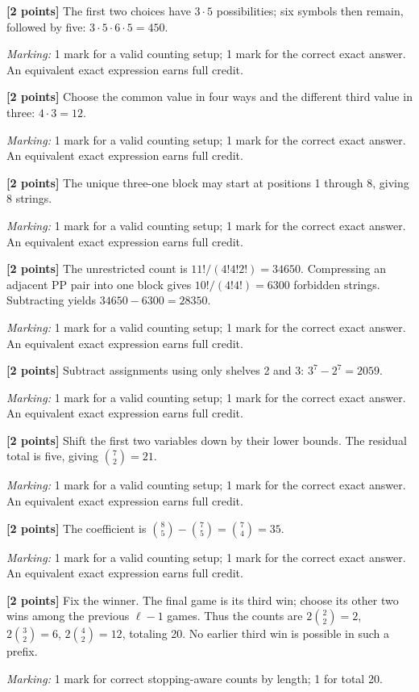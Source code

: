 \documentclass[12pt,letterpaper]{article}
\begin{document}
\begin{description}[font=\normalfont,leftmargin=1.2em,labelsep=0.4em]
\item[(a)] \textbf{[2 points]} The first two choices have $3\cdot5$ possibilities; six symbols then remain, followed by five: $3\cdot5\cdot6\cdot5=450$.
\par\textit{Marking:} 1 mark for a valid counting setup; 1 mark for the correct exact answer. An equivalent exact expression earns full credit.
\item[(b)] \textbf{[2 points]} Choose the common value in four ways and the different third value in three: $4\cdot3=12$.
\par\textit{Marking:} 1 mark for a valid counting setup; 1 mark for the correct exact answer. An equivalent exact expression earns full credit.
\item[(c)] \textbf{[2 points]} The unique three-one block may start at positions 1 through 8, giving 8 strings.
\par\textit{Marking:} 1 mark for a valid counting setup; 1 mark for the correct exact answer. An equivalent exact expression earns full credit.
\item[(d)] \textbf{[2 points]} The unrestricted count is $11!/(4!4!2!)=34650$. Compressing an adjacent PP pair into one block gives $10!/(4!4!)=6300$ forbidden strings. Subtracting yields $34650-6300=28350$.
\par\textit{Marking:} 1 mark for a valid counting setup; 1 mark for the correct exact answer. An equivalent exact expression earns full credit.
\item[(e)] \textbf{[2 points]} Subtract assignments using only shelves 2 and 3: $3^7-2^7=2059$.
\par\textit{Marking:} 1 mark for a valid counting setup; 1 mark for the correct exact answer. An equivalent exact expression earns full credit.
\item[(f)] \textbf{[2 points]} Shift the first two variables down by their lower bounds. The residual total is five, giving $\binom72=21$.
\par\textit{Marking:} 1 mark for a valid counting setup; 1 mark for the correct exact answer. An equivalent exact expression earns full credit.
\item[(g)] \textbf{[2 points]} The coefficient is $\binom85-\binom75=\binom74=35$.
\par\textit{Marking:} 1 mark for a valid counting setup; 1 mark for the correct exact answer. An equivalent exact expression earns full credit.
\item[(h)] \textbf{[2 points]} Fix the winner. The final game is its third win; choose its other two wins among the previous $\ell-1$ games. Thus the counts are $2\binom22=2$, $2\binom32=6$, $2\binom42=12$, totaling 20. No earlier third win is possible in such a prefix.
\par\textit{Marking:} 1 mark for correct stopping-aware counts by length; 1 for total 20.
\end{description}
\end{document}

